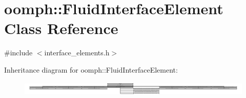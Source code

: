 \hypertarget{classoomph_1_1FluidInterfaceElement}{}\section{oomph\+:\+:Fluid\+Interface\+Element Class Reference}
\label{classoomph_1_1FluidInterfaceElement}


{\ttfamily \#include $<$interface\+\_\+elements.\+h$>$}

Inheritance diagram for oomph\+:\+:Fluid\+Interface\+Element\+:\begin{figure}[H]
\begin{center}
\leavevmode
\includegraphics[height=0.695035cm]{classoomph_1_1FluidInterfaceElement}
\end{center}
\end{figure}
